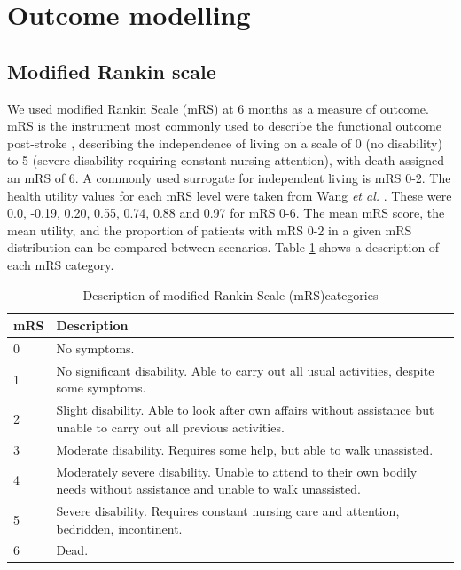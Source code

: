 \section{Outcome modelling}

\subsection{Modified Rankin scale}

We used modified Rankin Scale (mRS) at 6 months as a measure of outcome. mRS is the instrument most commonly used to describe the functional outcome post-stroke \cite{quinn_functional_2009}, describing the independence of living on a scale of 0 (no disability) to 5 (severe disability requiring constant nursing attention), with death assigned an mRS of 6. A commonly used surrogate for independent living is mRS 0-2. The health utility values for each mRS level were taken from Wang \textit{et al.} \cite{wang_utility-weighted_2020}. These were 0.0, -0.19, 0.20, 0.55, 0.74, 0.88 and 0.97 for mRS 0-6. The mean mRS score, the mean utility, and the proportion of patients with mRS 0-2 in a given mRS distribution can be compared between scenarios. Table \ref{tab:mrs} shows a description of each mRS category.

\begin{minipage}{1.0\textwidth}  %
\begin{longtable}{p{1.2cm} p{13cm}}
\caption{Description of modified Rankin Scale (mRS)categories}\label{tab:mrs}\\
\toprule
mRS & Description \\
\midrule
0 & No symptoms. \\
1 & No significant disability. Able to carry out all usual activities, despite some symptoms.\\
2 & Slight disability. Able to look after own affairs without assistance but unable to carry out all previous activities. \\
3 & Moderate disability. Requires some help, but able to walk unassisted.\\
4 & Moderately severe disability. Unable to attend to their own bodily needs without assistance and unable to walk unassisted. \\
5 & Severe disability. Requires constant nursing care and attention,
bedridden, incontinent.\\
6 & Dead.\\
\bottomrule
\end{longtable}
\end{minipage} 


